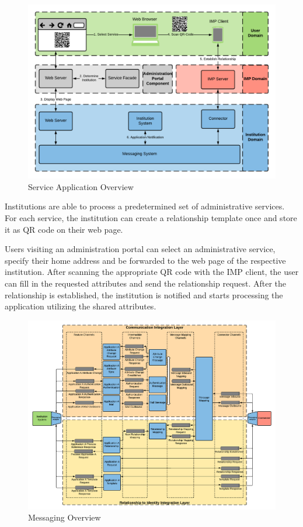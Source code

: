 \begin{figure}[h]
    \centering
    \includegraphics[scale=0.6]{Diagrams/Integration Architecture 2/Technological Integration/3. Application Overview.pdf}
    \caption{Service Application Overview}
    \label{integration2:application_overview}
\end{figure}

Institutions are able to process a predetermined set of administrative services. For each service, the institution can create a relationship template once and store it as QR code on their web page. 

Users visiting an administration portal can select an administrative service, specify their home address and be forwarded to the web page of the respective institution. After scanning the appropriate QR code with the IMP client, the user can fill in the requested attributes and send the relationship request. After the relationship is established, the institution is notified and starts processing the application utilizing the shared attributes.

\begin{figure}[h]
    \centering
    \includegraphics[scale=0.45]{Diagrams/Integration Architecture 2/Technological Integration/2. Messaging Overview.pdf}
    \caption{Messaging Overview}
    \label{integration2:messaging_overview}
\end{figure}

